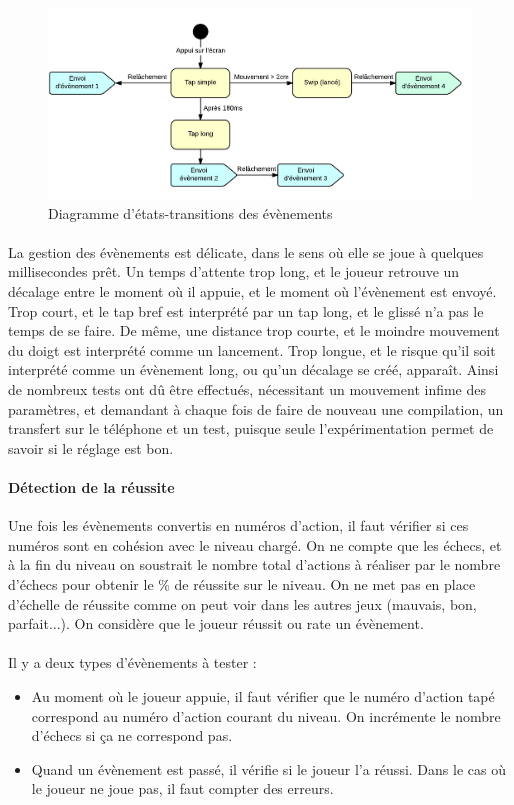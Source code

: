 \begin{figure}[!htb]\centering
  \includegraphics[scale=0.7]{./img/diagEtatTransition.png}
  \caption{Diagramme d'états-transitions des évènements}
  \label{diagetattrans}
\end{figure}


\paragraph{}
La gestion des évènements est délicate, dans le sens où elle se joue à quelques millisecondes prêt. Un temps d'attente trop long, et le joueur retrouve un décalage entre le moment où il appuie, et le moment où l'évènement est envoyé. Trop court, et le tap bref est interprété par un tap long, et le glissé n'a pas le temps de se faire. De même, une distance trop courte, et le moindre mouvement du doigt est interprété comme un lancement. Trop longue, et le risque qu'il soit interprété comme un évènement long, ou qu'un décalage se créé, apparaît. Ainsi de nombreux tests ont dû être effectués, nécessitant un mouvement infime des paramètres, et demandant à chaque fois de faire de nouveau une compilation, un transfert sur le téléphone et un test, puisque seule l'expérimentation permet de savoir si le réglage est bon.

\paragraph{Détection de la réussite}
Une fois les évènements convertis en numéros d'action, il faut vérifier si ces numéros sont en cohésion avec le niveau chargé. On ne compte que les échecs, et à la fin du niveau on soustrait le nombre total d'actions à réaliser par le nombre d'échecs pour obtenir le \% de réussite sur le niveau.
On ne met pas en place d'échelle de réussite comme on peut voir dans les autres jeux (mauvais, bon, parfait...). On considère que le joueur réussit ou rate un évènement.\\\\
Il y a deux types d'évènements à tester :
\begin{itemize}
\item Au moment où le joueur appuie, il faut vérifier que le numéro d'action tapé correspond au numéro d'action courant du niveau. On incrémente le nombre d'échecs si ça ne correspond pas.
\item Quand un évènement est passé, il vérifie si le joueur l'a réussi. Dans le cas où le joueur ne joue pas, il faut compter des erreurs.
\end{itemize}
